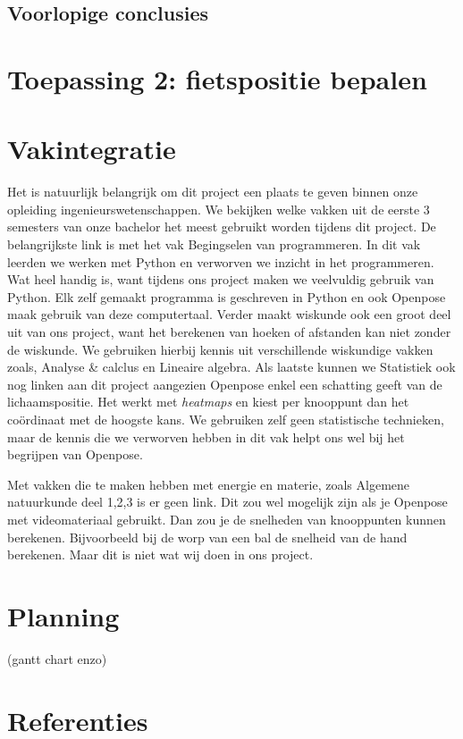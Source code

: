 \documentclass{article}
\begin{document}
	\subsection{Voorlopige conclusies}

\section{Toepassing 2: fietspositie bepalen}

\section{Vakintegratie}
Het is natuurlijk belangrijk om dit project een plaats te geven binnen onze opleiding ingenieurswetenschappen. We bekijken welke vakken uit de eerste 3 semesters van onze bachelor het meest gebruikt worden tijdens dit project. De belangrijkste link is met het vak Begingselen van programmeren. In dit vak leerden we werken met Python en verworven we inzicht in het programmeren. Wat heel handig is, want tijdens ons project maken we veelvuldig gebruik van Python. Elk zelf gemaakt programma is geschreven in Python en ook Openpose maak gebruik van deze computertaal. Verder maakt wiskunde ook een groot deel uit van ons project, want het berekenen van hoeken of afstanden kan niet zonder de wiskunde. We gebruiken hierbij kennis uit verschillende wiskundige vakken zoals, Analyse \& calclus en Lineaire algebra. Als laatste kunnen we Statistiek ook nog linken aan dit project aangezien Openpose enkel een schatting geeft van de lichaamspositie. Het werkt met \textit{heatmaps} en kiest per knooppunt dan het coördinaat met de hoogste kans. We gebruiken zelf geen statistische technieken, maar de kennis die we verworven hebben in dit vak helpt ons wel bij het begrijpen van Openpose. 

Met vakken die te maken hebben met energie en materie, zoals Algemene natuurkunde deel 1,2,3 is er geen link. Dit zou wel mogelijk zijn als je Openpose met videomateriaal gebruikt. Dan zou je de snelheden van knooppunten kunnen berekenen. Bijvoorbeeld bij de worp van een bal de snelheid van de hand berekenen. Maar dit is niet wat wij doen in ons project.
\section{Planning}
(gantt chart enzo\texttt{})

\section{Referenties}
\end{document}
